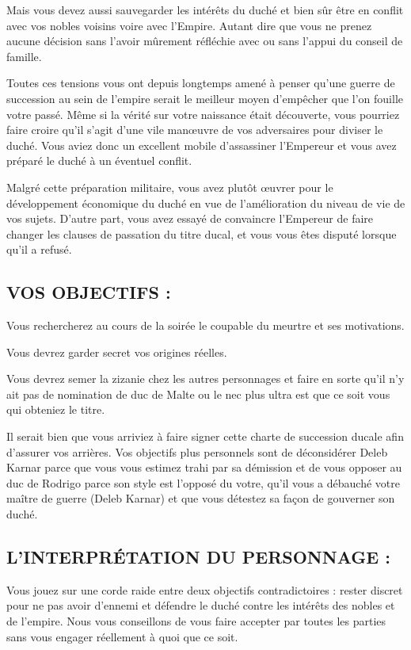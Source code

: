 \documentclass[14pt,twocolumn]{extarticle}
\begin{document}
Mais vous devez aussi sauvegarder les intérêts du duché et bien sûr être en
conflit avec vos nobles voisins voire avec l'Empire. Autant dire que vous ne
prenez aucune décision sans l'avoir mûrement réfléchie avec ou sans l'appui du
conseil de famille.

Toutes ces tensions vous ont depuis longtemps amené à penser qu'une guerre de
succession au sein de l'empire serait le meilleur moyen d’empêcher que l'on
fouille votre passé. Même si la vérité sur votre naissance était découverte,
vous pourriez faire croire qu'il s'agit d'une vile man\oe{}uvre de vos
adversaires pour diviser le duché. Vous aviez donc un excellent mobile
d'assassiner l'Empereur et vous avez préparé le duché à un éventuel conflit.

Malgré cette préparation militaire, vous avez plutôt \oe{}uvrer pour le
développement économique du duché en vue de l'amélioration du niveau de vie de
vos sujets. D'autre part, vous avez essayé de convaincre l'Empereur de faire
changer les clauses de passation du titre ducal, et vous vous êtes disputé
lorsque qu'il a refusé.

\subsection{VOS OBJECTIFS :}

Vous rechercherez au cours de la soirée le coupable du meurtre et ses
motivations.

Vous devrez garder secret vos origines réelles.

Vous devrez semer la zizanie chez les autres personnages et faire en sorte
qu'il n'y ait pas de nomination de duc de Malte ou le nec plus ultra est que ce
soit vous qui obteniez le titre.

Il serait bien que vous arriviez à faire signer cette charte de succession
ducale afin d'assurer vos arrières. Vos objectifs plus personnels sont de
déconsidérer Deleb Karnar parce que vous vous estimez trahi par sa démission et
de vous opposer au duc de Rodrigo parce son style est l'opposé du votre, qu'il
vous a débauché votre maître de guerre (Deleb Karnar) et que vous détestez sa
façon de gouverner son duché.

\subsection{L'INTERPRÉTATION DU PERSONNAGE :}

Vous jouez sur une corde raide entre deux objectifs contradictoires : rester
discret pour ne pas avoir d'ennemi et défendre le duché contre les intérêts des
nobles et de l'empire. Nous vous conseillons de vous faire accepter par toutes
les parties sans vous engager réellement à quoi que ce soit.
\end{document}
